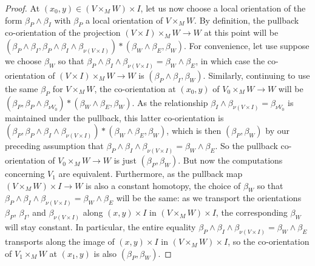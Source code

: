 \begin{proof}
	At $(x_0,y) \in (V \times_M W) \times I$, let us now choose a local orientation of the form $\beta_P \wedge \beta_I$ with $\beta_P$ a local orientation of $V \times_M W$.
	By definition, the pullback co-orientation of the projection $(V \times I) \times_M W \to W$ at this point will be $(\beta_P \wedge \beta_I, \beta_P \wedge \beta_I \wedge \beta_{\nu(V \times I)})* (\beta_W \wedge \beta_E,\beta_W)$.
	For convenience, let use suppose we choose $\beta_W$ so that $\beta_P \wedge \beta_I \wedge \beta_{\nu(V \times I)} = \beta_W \wedge \beta_E$, in which case the co-orientation of $(V \times I) \times_M W \to W$ is $(\beta_P \wedge \beta_I, \beta_W)$.
	Similarly, continuing to use the same $\beta_P$ for $V \times_M W$, the co-orientation at $(x_0,y)$ of $V_0 \times_M W \to W$ will be $(\beta_P,\beta_P \wedge \beta_{\nu V_0})* (\beta_W \wedge \beta_E,\beta_W)$.
	As the relationship $\beta_I \wedge \beta_{\nu(V \times I)} = \beta_{\nu V_0}$ is maintained under the pullback, this latter co-orientation is
	$(\beta_P,\beta_P \wedge \beta_I \wedge \beta_{\nu(V \times I)}) * (\beta_W \wedge \beta_E, \beta_W)$, which is then $(\beta_P,\beta_W)$ by our preceding assumption that $\beta_P \wedge \beta_I \wedge \beta_{\nu(V \times I)} = \beta_W \wedge \beta_E$.
	So the pullback co-orientation of $V_0 \times_M W \to W$ is just $(\beta_P, \beta_W)$.
	But now the computations concerning $V_1$ are equivalent.
	Furthermore, as the pullback map $(V \times_M W) \times I \to W$ is also a constant homotopy, the choice of $\beta_W$ so that $\beta_P \wedge \beta_I \wedge \beta_{\nu(V \times I)} = \beta_W \wedge \beta_E$ will be the same: as we transport the orientations $\beta_P$, $\beta_I$, and $\beta_{\nu(V \times I)}$ along $(x,y) \times I$ in $(V \times_M W) \times I$, the corresponding $\beta_W$ will stay constant.
	In particular, the entire equality $\beta_P \wedge \beta_I \wedge \beta_{\nu(V \times I)} = \beta_W \wedge \beta_E$ transports along the image of $(x,y) \times I$ in $(V \times_M W) \times I$, so the co-orientation of $V_1 \times_M W$ at $(x_1,y)$ is also $(\beta_P, \beta_W)$.
\end{proof}

